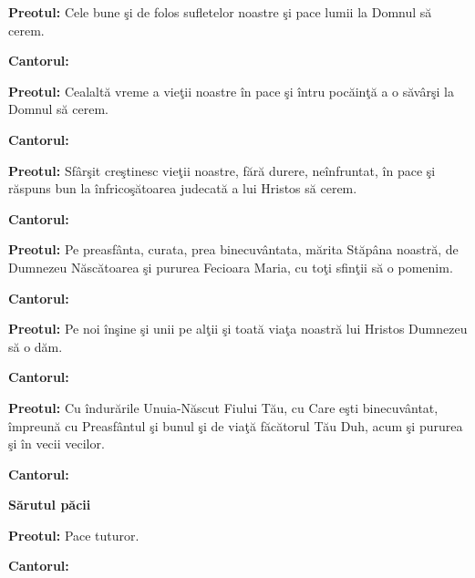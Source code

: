 \documentclass[11pt,letterpaper]{book} \usepackage{ucs}
\newcommand{\mysection}[1]{\begin{center}{\Large \bf #1}\end{center}}
\begin{document}
  {\bf Preotul:} Cele bune şi de folos sufletelor noastre şi pace
  lumii la Domnul să cerem.

  {\bf Cantorul:}
  \begin{center}
  \end{center}  

  {\bf Preotul:} Cealaltă vreme a vieţii noastre în pace şi întru
  pocăinţă a o săvârşi la Domnul să cerem.

  {\bf Cantorul:}
  \begin{center}
  \end{center}  

  {\bf Preotul:} Sfârşit creştinesc vieţii noastre, fără durere,
  neînfruntat, în pace şi răspuns bun la înfricoşătoarea judecată a
  lui Hristos să cerem.

  {\bf Cantorul:}
  \begin{center}
  \end{center}  

  {\bf Preotul:} Pe preasfânta, curata, prea binecuvântata, mărita
  Stăpâna noastră, de Dumnezeu Născătoarea şi pururea Fecioara Maria,
  cu toţi sfinţii să o pomenim.

  {\bf Cantorul:}


  {\bf Preotul:} Pe noi înşine şi unii pe alţii şi toată viaţa noastră
  lui Hristos Dumnezeu să o dăm.

  {\bf Cantorul:}
  \begin{center}
  \end{center}
  \pagebreak

  {\bf Preotul:} Cu îndurările Unuia-Născut Fiului Tău, cu Care eşti
  binecuvântat, împreună cu Preasfântul şi bunul şi de viaţă făcătorul
  Tău Duh, acum şi pururea şi în vecii vecilor.
  
  {\bf Cantorul:}
  \begin{center}
  \end{center}

  \mysection{Sărutul păcii}

  {\bf Preotul:} Pace tuturor.
  
  {\bf Cantorul:}
  \begin{center}
  \end{center}
\end{document}
